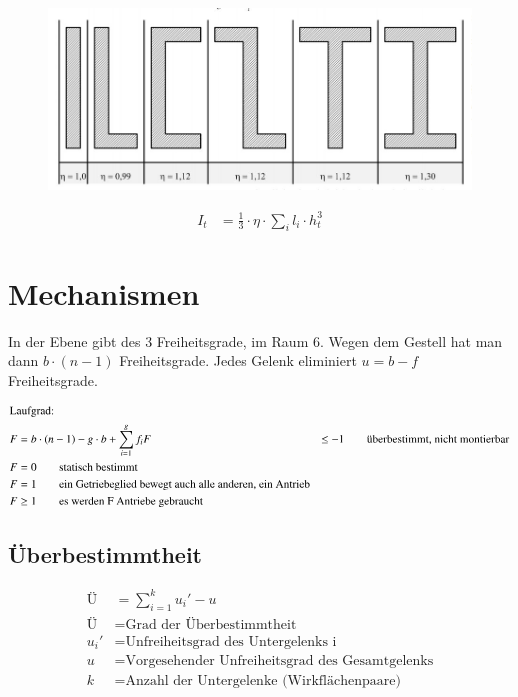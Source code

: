 \begin{figure}[h]
	\centering
	\includegraphics[scale=0.6]{Torsion_5.jpg}
\end{figure}

\begin{align*}
I_t &= \frac{1}{3} \cdot \eta \cdot \sum_{i}^{} l_i \cdot h_t^3
\end{align*}

\newpage


\section{Mechanismen}

In der Ebene gibt des 3 Freiheitsgrade, im Raum 6. Wegen dem Gestell hat man dann $b \cdot (n-1)$ Freiheitsgrade. Jedes Gelenk eliminiert $u = b - f$ Freiheitsgrade.

\begin{align*}
\intertext{Laufgrad:}
F &= b \cdot \left( n - 1 \right) - g \cdot b + \sum_{i=1}^{g} f_i
F &\leq -1 \qquad \text{überbestimmt, nicht montierbar} \\
F &= 0 \qquad \text{statisch bestimmt} \\
F &= 1 \qquad \text{ein Getriebeglied bewegt auch alle anderen, ein Antrieb} \\
F &\geq 1 \qquad \text{es werden F Antriebe gebraucht}
\end{align*}


\subsection*{Überbestimmtheit}

\begin{align*}
\text{Ü} &= \sum_{i=1}^{k} u_i' - u \\
\text{Ü} &= \text{Grad der Überbestimmtheit} \\
u_i' &= \text{Unfreiheitsgrad des Untergelenks i} \\
u &= \text{Vorgesehender Unfreiheitsgrad des Gesamtgelenks} \\
k &= \text{Anzahl der Untergelenke (Wirkflächenpaare)}
\end{align*}



